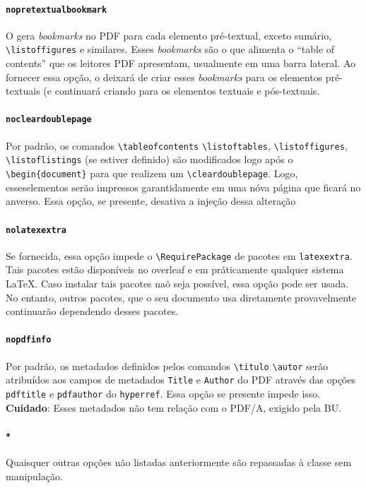 \documentclass[embeddedlogo]{../ufsc-thesis-rn46-2019}
\newcommand{\lacmd}[1]{\texttt{\textbackslash{}#1}}
\begin{document}
\paragraph*{\texttt{nopretextualbookmark}} O \abnTeX{} gera \emph{bookmarks} no
PDF para cada elemento pré-textual, exceto sumário, \lacmd{listoffigures} e
similares. Esses \emph{bookmarks} são o que alimenta o ``table of contents'' que
os leitores PDF apresentam, usualmente em uma barra lateral.  Ao fornecer essa
opção, o \abnTeX{} deixará de criar esses \emph{bookmarks} para os elementos
pré-textuais (e continuará criando para os elementos textuais e pós-textuais.

\paragraph*{\texttt{nocleardoublepage}} Por padrão, os comandos
\lacmd{tableofcontents} \lacmd{listoftables}, \lacmd{listoffigures},
\lacmd{listoflistings} (se estiver definido) são modificados logo após o
\lacmd{begin\{document\}} para que realizem um \lacmd{cleardoublepage}. Logo,
esseselementos serão impressos garantidamente em uma nóva página que ficará no
anverso. Essa opção, se presente, desativa a injeção dessa alteração

\paragraph*{\texttt{nolatexextra}}
Se fornecida, essa opção impede o \lacmd{RequirePackage} de pacotes em \texttt{latexextra}.
Tais pacotes estão disponíveis no overleaf e em práticamente qualquer sistema
\LaTeX. Caso instalar tais pacotes naõ seja possível, essa opção pode ser usada.
No entanto, outros pacotes, que o seu documento usa diretamente provavelmente
continuarão dependendo desses pacotes.

\paragraph*{\texttt{nopdfinfo}} Por padrão, os metadados definidos pelos
comandos \lacmd{titulo} \lacmd{autor} serão atribuídos aos campos de metadados
\texttt{Title} e \texttt{Author} do PDF através das opções \texttt{pdftitle} e
\texttt{pdfauthor} do \texttt{hyperref}. Essa opção se presente impede isso.
\textbf{Cuidado}: Esses metadados não tem relação com o PDF/A, exigido pela BU.

\paragraph*{\texttt{*}} Quaisquer outras opções não listadas anteriormente são
repassadas à classe \abnTeX{} sem manipulação.
\end{document}

